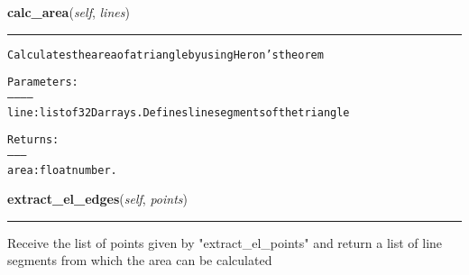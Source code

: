     \label{Classes:Triangles:calc_area}

    \vspace{0.5ex}

\hspace{.8\funcindent}\begin{boxedminipage}{\funcwidth}

    \raggedright \textbf{calc\_area}(\textit{self}, \textit{lines})

    \vspace{-1.5ex}

    \rule{\textwidth}{0.5\fboxrule}
\setlength{\parskip}{2ex}
\begin{alltt}

Calculates the area of a triangle by using Heron's theorem

Parameters:
-----------
line:  list of 3 2D arrays. Defines line segments of the triangle

Returns:
--------
area:  float number.          
\end{alltt}

\setlength{\parskip}{1ex}
    \end{boxedminipage}

    \label{Classes:Triangles:extract_el_edges}

    \vspace{0.5ex}

\hspace{.8\funcindent}\begin{boxedminipage}{\funcwidth}

    \raggedright \textbf{extract\_el\_edges}(\textit{self}, \textit{points})

    \vspace{-1.5ex}

    \rule{\textwidth}{0.5\fboxrule}
\setlength{\parskip}{2ex}
    Receive the list of points given by "extract\_el\_points" and return a 
    list of line segments from which the area can be calculated

\setlength{\parskip}{1ex}
    \end{boxedminipage}

    \label{Classes:Triangles:extract_el_points}

